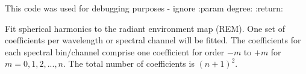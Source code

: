 \documentclass[a4paper,10pt,english]{sphinxmanual}
\begin{document}
\begin{fulllineitems}
\begin{fulllineitems}
\end{fulllineitems}


\begin{fulllineitems}
\label{packages:librad.RadEnv.sph_harm_fat}
This code was used for debugging purposes - ignore
:param degree:
:return:

\end{fulllineitems}


\begin{fulllineitems}
\label{packages:librad.RadEnv.sph_harm_fit}
Fit spherical harmonics to the radiant environment map (REM).
One set of coefficients per wavelength or spectral channel will be fitted. The coefficients for each spectral
bin/channel comprise one coefficient for order \(-m\) to \(+m\) for \(m = 0, 1, 2, ..., n\).
The total number of coefficients is \((n+1)^2\).


\end{fulllineitems}
\end{fulllineitems}
\end{document}
